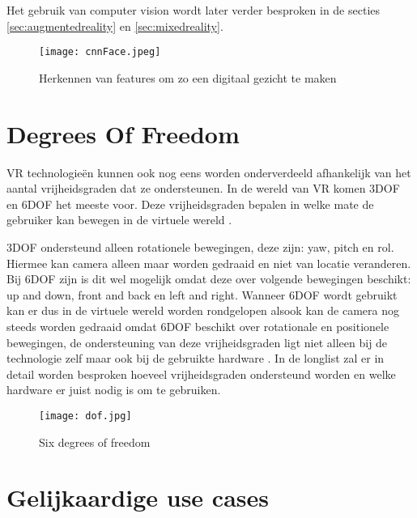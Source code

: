 Het gebruik van computer vision wordt later verder besproken in de secties \ref{sec:augmentedreality} en \ref{sec:mixedreality}. %
\begin{figure}
    \texttt{[image: cnnFace.jpeg]}
    \caption{Herkennen van features om zo een digitaal gezicht te maken}
    \label{fig:cnnface}
\end{figure}

\section{Degrees Of Freedom}

VR technologieën kunnen ook nog eens worden onderverdeeld afhankelijk van het aantal vrijheidsgraden dat ze ondersteunen. In de wereld van VR komen 3DOF en 6DOF het meeste voor. Deze vrijheidsgraden bepalen in welke mate de gebruiker kan bewegen in de virtuele wereld \autocite{Chen1995}.

3DOF ondersteund alleen rotationele bewegingen, deze zijn: yaw, pitch en rol. Hiermee kan camera alleen maar worden gedraaid en niet van locatie veranderen. Bij 6DOF zijn is dit wel mogelijk omdat deze over volgende bewegingen beschikt: up and down, front and back en left and right. 
Wanneer 6DOF wordt gebruikt kan er dus in de virtuele wereld worden rondgelopen alsook kan de camera nog steeds worden gedraaid omdat 6DOF beschikt over rotationale en positionele bewegingen, de ondersteuning van deze vrijheidsgraden ligt niet alleen bij de technologie zelf maar ook bij de gebruikte hardware \autocite{Chen1995}. In de longlist zal er in detail worden besproken hoeveel vrijheidsgraden ondersteund worden en welke hardware er juist nodig is om te gebruiken.

\begin{figure}
    \texttt{[image: dof.jpg]}
    \caption{Six degrees of freedom}
    \label{fig:dof}
\end{figure}


\section{Gelijkaardige use cases}
